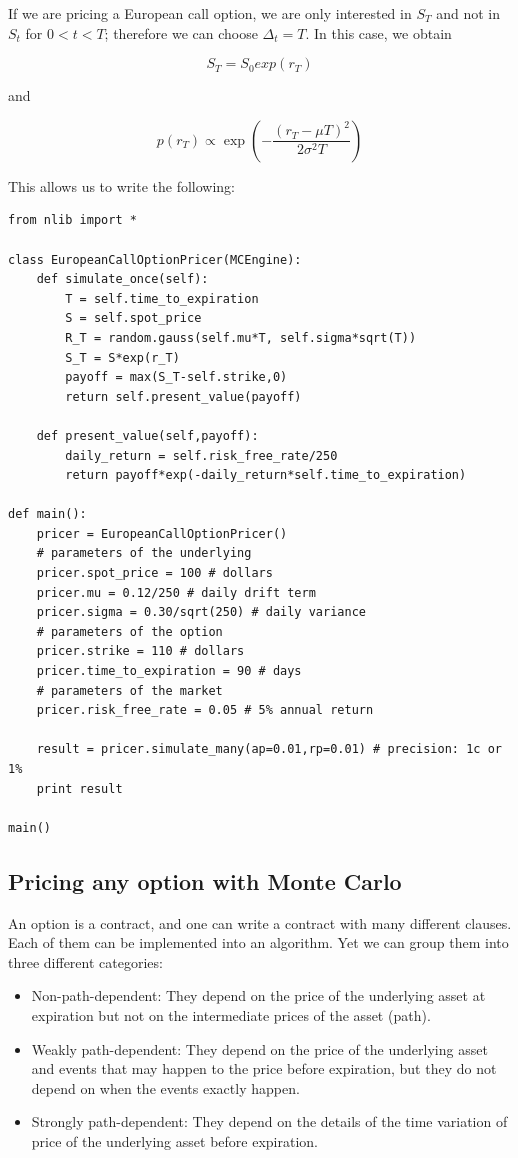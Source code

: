 \documentclass[justified,sixbynine]{tufte-book}
\def\ft{\small\tt}
\theoremstyle{plain}%
\theoremstyle{definition}
\theoremstyle{remark}
\begin{document}
\begin{fullwidth}
If we are pricing a European call option, we are only interested in $S_T$ and not in $S_t$ for $0<t<T$; therefore we can choose $\Delta_t = T$. In this case, we obtain

\begin{equation}
S_T = S_0 exp(r_T)
\end{equation}

and

\begin{equation}
p(r_T) \propto \exp\left(-\frac{(r_T-\mu T)^2}{2\sigma^2 T}\right)
\end{equation}

This allows us to write the following:

\begin{lstlisting}[caption={in file: {\ft options.py}}]
from nlib import *

class EuropeanCallOptionPricer(MCEngine):
    def simulate_once(self):
        T = self.time_to_expiration
        S = self.spot_price
        R_T = random.gauss(self.mu*T, self.sigma*sqrt(T))
        S_T = S*exp(r_T)
        payoff = max(S_T-self.strike,0)
        return self.present_value(payoff)

    def present_value(self,payoff):
        daily_return = self.risk_free_rate/250
        return payoff*exp(-daily_return*self.time_to_expiration)

def main():
    pricer = EuropeanCallOptionPricer()
    # parameters of the underlying
    pricer.spot_price = 100 # dollars
    pricer.mu = 0.12/250 # daily drift term
    pricer.sigma = 0.30/sqrt(250) # daily variance
    # parameters of the option
    pricer.strike = 110 # dollars
    pricer.time_to_expiration = 90 # days
    # parameters of the market
    pricer.risk_free_rate = 0.05 # 5% annual return

    result = pricer.simulate_many(ap=0.01,rp=0.01) # precision: 1c or 1%
    print result

main()
\end{lstlisting}

\goodbreak\subsection{Pricing any option with Monte Carlo}

An option is a contract, and one can write a contract with many different clauses. Each of them can be implemented into an algorithm. Yet we can group them into three different categories:
\begin{itemize}
\item Non-path-dependent: They depend on the price of the underlying asset at expiration but not on the intermediate prices of the asset (path).
\item Weakly path-dependent: They depend on the price of the underlying asset and events that may happen to the price before expiration, but they do not depend on when the events exactly happen.
\item Strongly path-dependent: They depend on the details of the time variation of price of the underlying asset before expiration.
\end{itemize}


\end{fullwidth}
\end{document}
